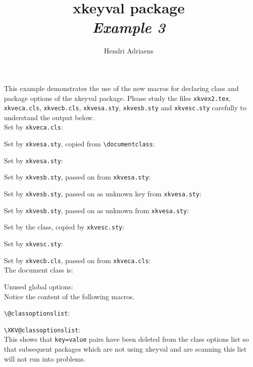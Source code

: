 \documentclass[keyi=test1,keyvi,another=key,IgnoredGlobal,10pt]{xkveca}
\title{\textsf{xkeyval} package\\\normalsize\emph{Example 3}}
\author{Hendri Adriaens}
\makeatletter
\let\@tempa\@classoptionslist
\let\@tempb\@unusedoptionlist
\makeatother
\begin{document}
\maketitle

This example demonstrates the use of the new macros for declaring
class and package options of the \textsf{xkeyval} package. Please
study the files \verb+xkvex2.tex+, \verb+xkveca.cls+,
\verb+xkvecb.cls+, \verb+xkvesa.sty+, \verb+xkvesb.sty+ and
\verb+xkvesc.sty+ carefully to understand the output below.\\

Set by \verb+xkveca.cls+: \keyi\par
Set by \verb+xkvesa.sty+, copied from \verb+\documentclass+: \keyia\par
Set by \verb+xkvesa.sty+: \keyii\par
Set by \verb+xkvesb.sty+, passed on from \verb+xkvesa.sty+: \keyiii\par
Set by \verb+xkvesb.sty+, passed on as unknown key from \verb+xkvesa.sty+: \keyiv\par
Set by \verb+xkvesb.sty+, passed on as unknown from \verb+xkvesa.sty+: \keyv\par
Set by the class, copied by \verb+xkvesc.sty+: \keyvi\par
Set by \verb+xkvesc.sty+: \keyvii\par
Set by \verb+xkvecb.cls+, passed on from \verb+xkveca.cls+: \keyviii\\

The document class is: \XKV@documentclass\par
Unused global options: \@tempb\\

Notice the content of the following macros.\par
\verb+\@classoptionslist+: \@tempa\par
\verb+\XKV@classoptionslist+: \XKV@classoptionslist\\

This shows that \verb+key=value+ pairs have been deleted from the
class options list so that subsequent packages which are not using
\textsf{xkeyval} and are scanning this list will not run into
problems.\\
\end{document}
